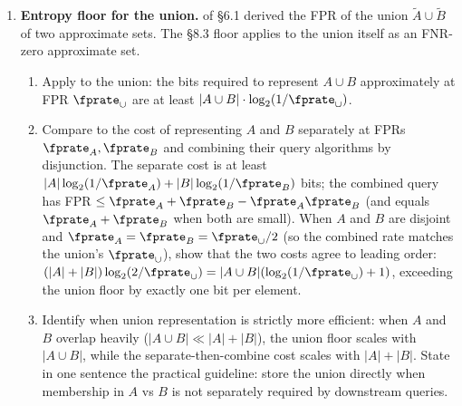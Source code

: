 \begin{enumerate}
\item \exstarstarstar
\label{ex:ch8-11}
\textbf{Entropy floor for the union.}
 of §6.1 derived the FPR of the union
$\tilde A \cup \tilde B$ of two approximate sets. The §8.3 floor
applies to the union itself as an FNR-zero approximate set.
\begin{enumerate}
  \item[(a)] Apply  to the union: the bits
    required to represent $A \cup B$ approximately at FPR
    $\fprate_\cup$ are at least $|A \cup B| \cdot \log_2(1 /
    \fprate_\cup)$.
  \item[(b)] Compare to the cost of representing $A$ and $B$
    separately at FPRs $\fprate_A, \fprate_B$ and combining their
    query algorithms by disjunction. The separate cost is at
    least $|A| \log_2(1/\fprate_A) + |B| \log_2(1/\fprate_B)$ bits;
    the combined query has FPR $\le \fprate_A + \fprate_B -
    \fprate_A \fprate_B$ (and equals $\fprate_A + \fprate_B$ when
    both are small). When $A$ and $B$ are disjoint and
    $\fprate_A = \fprate_B = \fprate_\cup / 2$ (so the combined
    rate matches the union's $\fprate_\cup$), show that the two
    costs agree to leading order: $(|A| + |B|)
    \log_2(2/\fprate_\cup) = |A \cup B|(\log_2(1/\fprate_\cup) +
    1)$, exceeding the union floor by exactly one bit per element.
  \item[(c)] Identify when union representation is strictly more
    efficient: when $A$ and $B$ overlap heavily ($|A \cup B| \ll
    |A| + |B|$), the union floor scales with $|A \cup B|$, while
    the separate-then-combine cost scales with $|A| + |B|$. State
    in one sentence the practical guideline: store the union
    directly when membership in $A$ vs $B$ is not separately
    required by downstream queries.
\end{enumerate}

\end{enumerate}
